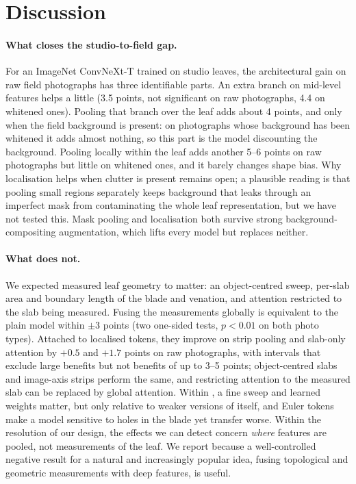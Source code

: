 \section{Discussion}
\label{sec:discussion}

\paragraph{What closes the studio-to-field gap.} For an ImageNet ConvNeXt-T trained on studio leaves,
the architectural gain on raw field photographs has three identifiable parts. An extra branch on
mid-level features helps a little (3.5 points, not significant on raw photographs, 4.4 on whitened
ones). Pooling that branch over the leaf adds about 4 points, and only when the field background is
present: on photographs whose background has been whitened it adds almost nothing, so this part is the
model discounting the background. Pooling locally within the leaf adds another 5--6 points on raw
photographs but little on whitened ones, and it barely changes shape bias. Why localisation helps
when clutter is present remains open; a plausible reading is that pooling small regions separately
keeps background that leaks through an imperfect mask from contaminating the whole leaf
representation, but we have not tested this. Mask pooling and localisation both survive strong
background-compositing augmentation, which lifts every model but replaces neither.

\paragraph{What does not.} We expected measured leaf geometry to matter: an object-centred sweep,
per-slab area and boundary length of the blade and venation, and attention restricted to the slab
being measured. Fusing the measurements globally is equivalent to the plain model within $\pm3$ points
(two one-sided tests, $p<0.01$ on both photo types). Attached to localised tokens, they improve on
strip pooling and slab-only attention by $+0.5$ and $+1.7$ points on raw photographs, with intervals
that exclude large benefits but not benefits of up to 3--5 points; object-centred slabs and
image-axis strips perform the same, and restricting attention to the measured slab can be replaced by
global attention. Within \SVA{}, a fine sweep and learned weights matter, but only relative to weaker
versions of \SVA{} itself, and Euler tokens make a model sensitive to holes in the blade yet transfer
worse. Within the resolution of our design, the effects we can detect concern \emph{where} features
are pooled, not measurements of the leaf. We report \SVA{} because a well-controlled negative result
for a natural and increasingly popular idea, fusing topological and geometric measurements with deep
features, is useful.
